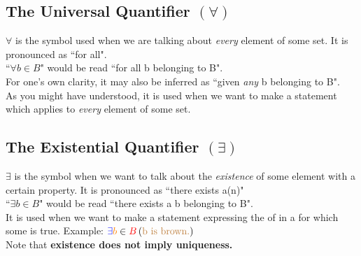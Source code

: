 \subsection{The Universal Quantifier \texorpdfstring{$\left(\forall\right)$}{}} \label{ssec:univquant}
$\forall$ is the symbol used when we are talking about \textit{every} element of some set. It is pronounced as ``for all".\\
``$\forall b \in B$" would be read ``for all b belonging to B".\\
For one's own clarity, it may also be inferred as ``given \textit{any} b belonging to B".\\
As you might have understood, it is used when we want to make a statement which applies to \textit{every} element of some set.
%
%
\subsection{The Existential Quantifier \texorpdfstring{$\left(\exists\right)$}{}} \label{ssec:exisquant}
$\exists$ is the symbol when we want to talk about the \textit{existence} of some element with a certain property. It is pronounced as ``there exists a(n)"\\
``$\exists b \in B$" would be read ``there exists a b belonging to B".\\
It is used when we want to make a statement expressing the {\color{blue}{existence}} of {\color{orange}{some element}} in a {\color{red}{set}} for which some {\color{brown}{certain statement}} is true. Example: ${\color{blue}{\exists}} {\color{orange}{b}} \in {\color{red}{B}} \left({\color{brown}{\text{b is brown.}}}\right)$\\
Note that \textbf{existence does not imply uniqueness.}
%
%
